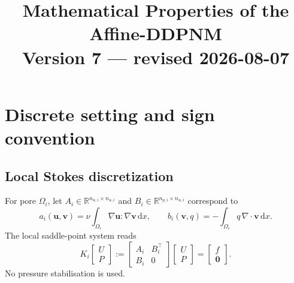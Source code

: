 \documentclass[11pt,a4paper]{article}
\newcommand{\R}{\mathbb{R}}
\newcommand{\pore}[1]{\Omega_{#1}}
\newcommand{\vel}{\bm{u}}
\newcommand{\zero}{\bm{0}}
\begin{document}
\title{\textbf{Mathematical Properties of the Affine-DDPNM}\\[4pt]
       \large Version 7 --- revised 2026-08-07}
\author{}
\date{}
\maketitle

\begin{center}
\end{center}

\section{Discrete setting and sign convention}

\subsection{Local Stokes discretization}

For pore $\pore{i}$, let $A_i \in \R^{n_{u,i}\times n_{u,i}}$ and
$B_i \in \R^{n_{p,i}\times n_{u,i}}$ correspond to
\[
  a_i(\vel,\bm{v}) = \nu\!\int_{\pore{i}}\!\nabla\vel:\nabla\bm{v}\,\mathrm{d}x,
  \qquad
  b_i(\bm{v},q) = -\!\int_{\pore{i}}\!q\,\nabla\!\cdot\!\bm{v}\,\mathrm{d}x.
\]
The local saddle-point system reads
\begin{equation}\label{eq:saddle}
  K_i\begin{bmatrix}U\\P\end{bmatrix}
  := \begin{bmatrix}A_i&B_i^\top\\B_i&0\end{bmatrix}
  \begin{bmatrix}U\\P\end{bmatrix}
  = \begin{bmatrix}f\\\zero\end{bmatrix}.
\end{equation}
No pressure stabilisation is used.
\end{document}
